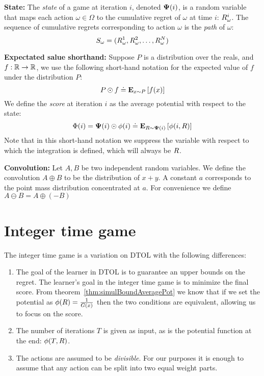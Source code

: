 \documentclass{article}[12pt]
\begin{document}
{\bf State:} The {\em state} of a game at iteration $i$, denoted ${\bf \Psi}(i)$, is
a random variable that maps each action $\omega \in \Omega$ to the
cumulative regret of $\omega$ at time $i$: $R_\omega^i$. The sequence
of cumulative regrets corresponding to action $\omega$ is the {\em
  path} of $\omega$:
\begin{equation} \label{eqn:path}
  S_{\omega}=(R_\omega^1,R_\omega^2,\ldots,R_\omega^N)
\end{equation}

{\bf Expectated salue shorthand:} Suppose $P$ is a distribution over the reals, and $f:\mathbb{R}
\to \mathbb{R}$, we use the following short-hand notation for the expected
value of $f$ under the distribution $P$:
\[ P \odot f \doteq {\bf E}_{x \sim P}\left[ f(x) \right]  \]
We define the {\em score} at iteration $i$ as the average potential
with respect to the state:
\[ \Phi(i) = {\bf \Psi}(i) \odot \phi(i) \doteq {\bf E}_{R \sim {\bf \Psi}(i)}\left[ \phi(i,R) \right]\]
Note that in this short-hand notation we suppress the variable with
respect to which the integration is defined, which will always be $R$.

{\bf Convolution:} Let $A,B$ be two independent random variables. We define the
convolution $A \oplus B$ to be the distribution of $x+y$. A constant
$a$ corresponds to the point mass distribution concentrated at
$a$. For convenience we define $A \ominus B = A \oplus (-B)$


\section{Integer time game}

The integer time game is a variation on DTOL with the following
differences:
\begin{enumerate}
\item The goal of the learner in DTOL is to guarantee an upper bounds
  on the regret. The learner's goal in the integer time game is to
  minimize the final score. From theorem~\ref{thm:simulBoundAveragePot} we know that if
  we set the potential as $\phi(R) = \frac{1}{G(x)}$ then the two
  conditions are equivalent, allowing us to focus on the score.
\item The number of iterations $T$ is given as input, as is the
  potential function at the end: $\phi(T,R)$.
\item The actions are assumed to be {\em divisible}. For our purposes
it is enough to assume that any action can be split into two equal
weight parts.
\end{enumerate}
\end{document}
